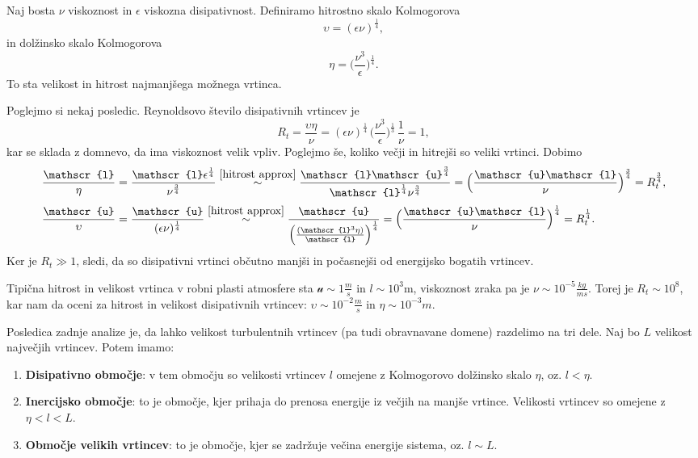 \documentclass[mat2, tisk]{fmfdelo}
\newcommand{\bd}{\textbf}
\begin{document}
\begin{definicija}
Naj bosta $\nu$ viskoznost in $\epsilon$ viskozna disipativnost. Definiramo hitrostno skalo Kolmogorova 
\begin{equation}
\label{def:kolmogorov speed}
  \upsilon = (\epsilon \nu)^\frac{1}{4},
\end{equation}
in dolžinsko skalo Kolmogorova
\begin{equation}
\label{def:kolmogorov length}
  \eta = \Big(\frac{\nu^3}{\epsilon} \Big)^\frac{1}{4}.
\end{equation}
To sta  velikost in hitrost najmanjšega možnega vrtinca.
\end{definicija}

Poglejmo si nekaj posledic. Reynoldsovo število disipativnih vrtincev je 
$$
R_t = \frac{\upsilon\eta}{\nu} = (\epsilon \nu)^\frac{1}{4}\,\Big(\frac{\nu^3}{\epsilon} \Big)^\frac{1}{3} \,\frac{1}{\nu} = 1,
$$
kar se sklada z domnevo, da ima viskoznost velik vpliv. Poglejmo še, koliko večji in hitrejši so veliki vrtinci. Dobimo
\begin{align*}
\frac{\mathscr{l}}{\eta} &= \frac{\mathscr{l} \epsilon^\frac{1}{4}}{\nu^\frac{3}{4}} \stackrel{\eqref{hitrost approx}}{\sim}
\frac{\mathscr{l} \mathscr{u}^\frac{3}{4}}{\mathscr{l}^\frac{1}{4}\nu^\frac{3}{4}} = \Big(\frac{\mathscr{u}\mathscr{l}}{\nu} \Big)^\frac{3}{4} = R_t^\frac{3}{4}, \\[1mm]
\frac{\mathscr{u}}{\upsilon} &= \frac{\mathscr{u}}{(\epsilon \nu)^\frac{1}{4}} \stackrel{\eqref{hitrost approx}}{\sim} 
\frac{\mathscr{u}}{\Big(\frac{(\mathscr{l}^3 \eta)}{\mathscr{l}}\Big)^\frac{1}{4}} = 
\Big(\frac{\mathscr{u} \mathscr{l}}{\nu}\Big)^\frac{1}{4} = R_t^\frac{1}{4}.
\end{align*}
Ker je $R_t \gg 1$, sledi, da so disipativni vrtinci občutno manjši in 
počasnejši od energijsko bogatih vrtincev.
\begin{primer}
Tipična hitrost in velikost vrtinca v robni plasti atmosfere sta $\mathscr{u} \sim 1 \frac{m}{s}$ in 
$l \sim 10^3$m, viskoznost zraka pa je $\nu \sim 10^{-5} \frac{kg}{m s}$. Torej je 
$R_t \sim 10^8$, kar nam da oceni za hitrost in velikost disipativnih vrtincev:
$\upsilon \sim 10^{-2} \frac{m}{s}$ in $\eta \sim 10^{-3}m$.
\end{primer}

Posledica zadnje analize je, da lahko velikost turbulentnih vrtincev (pa tudi obravnavane domene)
razdelimo na tri dele. Naj bo $L$ velikost največjih vrtincev. Potem imamo:
\begin{enumerate}
\item[i)] \bd{Disipativno območje}: v tem območju so velikosti vrtincev $l$ omejene z Kolmogorovo dolžinsko skalo $\eta$, oz. $l < \eta$.
\item[ii)] \bd{Inercijsko območje}: to je območje, kjer prihaja do prenosa energije iz večjih na manjše vrtince. Velikosti vrtincev so omejene z $\eta < l < L$.
\item[iii)] \bd{Območje velikih vrtincev}: to je območje, kjer se zadržuje večina energije sistema, oz. $l \sim L$.
\end{enumerate}
\end{document}
